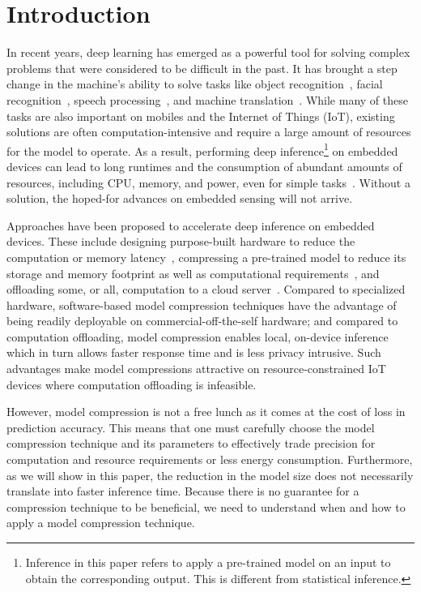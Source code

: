 \section{Introduction}
In recent years, deep learning has emerged as a powerful tool for solving complex problems that were considered to be difficult in the
past. It has brought a step change in the machine's ability to solve tasks like object recognition~\cite{donahue14,he2016deep}, facial
recognition~\cite{parkhi2015deep,sun2014deep}, speech processing~\cite{pmlrv48amodei16}, and machine translation~\cite{bahdanau2014neural}.
While many of these tasks are also important on mobiles and the Internet of Things (IoT), existing solutions are often
computation-intensive and require a large amount of resources for the model to operate. As a result, performing deep
inference\footnote{Inference in this paper refers to apply a pre-trained model on an input to obtain the corresponding output. This is
different from statistical inference.} on embedded devices can lead to long runtimes and the consumption of abundant amounts of resources,
including CPU, memory, and power, even for simple tasks~\cite{CanzianiPC16}. Without a solution,
 the hoped-for advances on embedded sensing will not arrive.


Approaches have been proposed to accelerate deep inference on embedded devices. These include designing purpose-built hardware to reduce
the computation or memory latency~\cite{georgiev2017low}, compressing a pre-trained model to reduce its storage and memory footprint as
well as computational requirements~\cite{han2016eie}, and offloading some, or all, computation to a cloud
server~\cite{Kang2017neurosurgeon,teerapittayanon2017distributed}. Compared to specialized hardware, software-based model compression
techniques have the advantage of being readily deployable on commercial-off-the-self hardware; and compared to computation offloading,
model compression enables local, on-device inference which in turn allows faster response time and is less privacy intrusive. Such
advantages make model compressions attractive on resource-constrained IoT devices where computation offloading is infeasible.


However, model compression is not a free lunch as it comes at the cost of loss in prediction accuracy. This
means that one must carefully choose the model compression technique and its parameters to effectively trade precision for computation and
resource requirements or less energy consumption. Furthermore, as we will show in this paper, the reduction in the model size does not
necessarily translate into faster inference time. Because there is no guarantee for a compression technique to be beneficial, we need to
understand when and how to apply a model compression technique.

